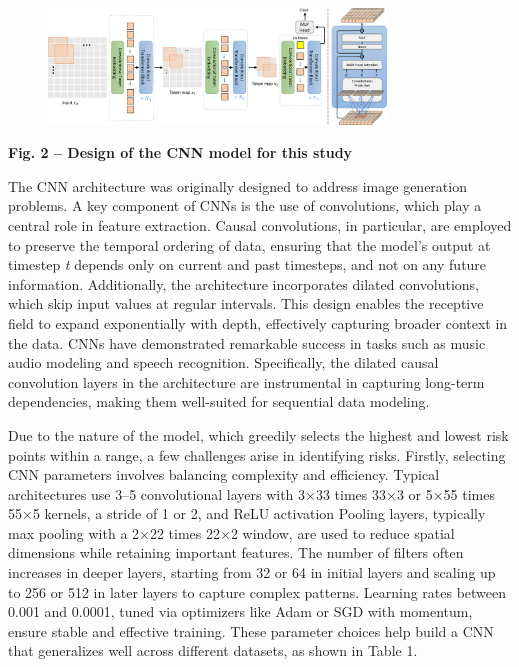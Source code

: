 {\begin{figure}[H]
	\centering
	\includegraphics[width=0.8\textwidth]{media/ict2/image10}
	\caption*{}
\end{figure}


{\bfseries Fig. 2 -- Design of the CNN model for this study}

The CNN architecture was originally designed to address image generation
problems. A key component of CNNs is the use of convolutions, which play
a central role in feature extraction. Causal convolutions, in
particular, are employed to preserve the temporal ordering of data,
ensuring that the model's output at timestep \emph{t} depends only on
current and past timesteps, and not on any future information.
Additionally, the architecture incorporates dilated convolutions, which
skip input values at regular intervals. This design enables the
receptive field to expand exponentially with depth, effectively
capturing broader context in the data. CNNs have demonstrated remarkable
success in tasks such as music audio modeling and speech recognition.
Specifically, the dilated causal convolution layers in the architecture
are instrumental in capturing long-term dependencies, making them
well-suited for sequential data modeling.

Due to the nature of the model, which greedily selects the highest and
lowest risk points within a range, a few challenges arise in identifying
risks. Firstly, selecting CNN parameters involves balancing complexity
and efficiency. Typical architectures use 3--5 convolutional layers with
3×33 times 33×3 or 5×55 times 55×5 kernels, a stride of 1 or 2, and ReLU
activation Pooling layers, typically max pooling with a 2×22 times 22×2
window, are used to reduce spatial dimensions while retaining important
features. The number of filters often increases in deeper layers,
starting from 32 or 64 in initial layers and scaling up to 256 or 512 in
later layers to capture complex patterns. Learning rates between 0.001
and 0.0001, tuned via optimizers like Adam or SGD with momentum, ensure
stable and effective training. These parameter choices help build a CNN
that generalizes well across different datasets, as shown in Table 1.

}
